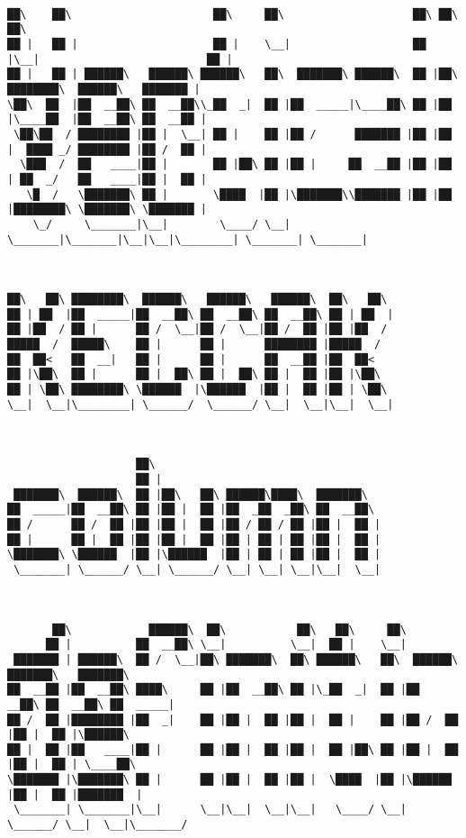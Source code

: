 \documentclass[varwidth=\maxdimen,margin=0.5cm,multi={verbatim}]{standalone}
\begin{document}
\begin{verbatim}

██\    ██\                      ██\     ██\                    ██\ ██\                           ██\
██ |   ██ |                     ██ |    \__|                   ██ |\__|                          ██ |
██ |   ██ | ██████\   ██████\ ██████\   ██\  ███████\ ██████\  ██ |██\ ████████\  ██████\   ███████ |
\██\  ██  |██  __██\ ██  __██\\_██  _|  ██ |██  _____|\____██\ ██ |██ |\____██  |██  __██\ ██  __██ |
 \██\██  / ████████ |██ |  \__| ██ |    ██ |██ /      ███████ |██ |██ |  ████ _/ ████████ |██ /  ██ |
  \███  /  ██   ____|██ |       ██ |██\ ██ |██ |     ██  __██ |██ |██ | ██  _/   ██   ____|██ |  ██ |
   \█  /   \███████\ ██ |       \████  |██ |\███████\\███████ |██ |██ |████████\ \███████\ \███████ |
    \_/     \_______|\__|        \____/ \__| \_______|\_______|\__|\__|\________| \_______| \_______|



██\   ██\ ████████\  ██████\   ██████\   ██████\  ██\   ██\
██ | ██  |██  _____|██  __██\ ██  __██\ ██  __██\ ██ | ██  |
██ |██  / ██ |      ██ /  \__|██ /  \__|██ /  ██ |██ |██  /
█████  /  █████\    ██ |      ██ |      ████████ |█████  /
██  ██<   ██  __|   ██ |      ██ |      ██  __██ |██  ██<
██ |\██\  ██ |      ██ |  ██\ ██ |  ██\ ██ |  ██ |██ |\██\
██ | \██\ ████████\ \██████  |\██████  |██ |  ██ |██ | \██\
\__|  \__|\________| \______/  \______/ \__|  \__|\__|  \__|



                    ██\
                    ██ |
 ███████\  ██████\  ██ |██\   ██\ ██████\████\  ███████\
██  _____|██  __██\ ██ |██ |  ██ |██  _██  _██\ ██  __██\
██ /      ██ /  ██ |██ |██ |  ██ |██ / ██ / ██ |██ |  ██ |
██ |      ██ |  ██ |██ |██ |  ██ |██ | ██ | ██ |██ |  ██ |
\███████\ \██████  |██ |\██████  |██ | ██ | ██ |██ |  ██ |
 \_______| \______/ \__| \______/ \__| \__| \__|\__|  \__|



       ██\            ██████\  ██\           ██\   ██\     ██\
      ██ |          ██  __██\ \__|          \__|  ██ |    \__|
 ███████ | ██████\  ██ /  \__|██\ ███████\  ██\ ██████\   ██\  ██████\  ███████\   ███████\
██  __██ |██  __██\ ████\     ██ |██  __██\ ██ |\_██  _|  ██ |██  __██\ ██  __██\ ██  _____|
██ /  ██ |████████ |██  _|    ██ |██ |  ██ |██ |  ██ |    ██ |██ /  ██ |██ |  ██ |\██████\
██ |  ██ |██   ____|██ |      ██ |██ |  ██ |██ |  ██ |██\ ██ |██ |  ██ |██ |  ██ | \____██\
\███████ |\███████\ ██ |      ██ |██ |  ██ |██ |  \████  |██ |\██████  |██ |  ██ |███████  |
 \_______| \_______|\__|      \__|\__|  \__|\__|   \____/ \__| \______/ \__|  \__|\_______/





\end{verbatim}
\end{document}
